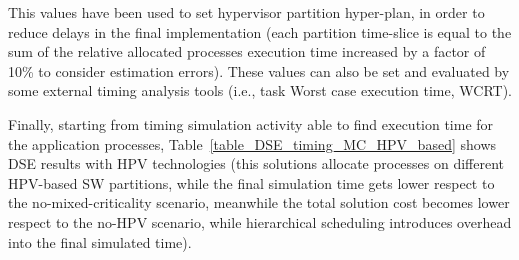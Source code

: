 \normalsize
%
This values have been used to set hypervisor partition hyper-plan, in order to reduce delays in the final implementation (each partition time-slice is equal to the sum of the relative allocated processes execution time increased by a factor of 10\% to consider estimation errors). These values can also be set and evaluated by some external timing analysis tools (i.e., task Worst case execution time, WCRT). \par
Finally, starting from timing simulation activity able to find execution time for the application processes, Table~\ref{table_DSE_timing_MC_HPV_based} shows DSE results with HPV technologies (this solutions allocate processes on different HPV-based SW partitions, while the final simulation time gets lower respect to the no-mixed-criticality scenario, meanwhile the total solution cost becomes lower respect to the no-HPV scenario, while hierarchical scheduling introduces overhead into the final simulated time). \par
%
\begin{table}[htbp]
\caption{Timing Simulation (with hierarchical scheduling).}
\begin{center}
\label{table_DSE_timing_MC_HPV_based}
\end{center}
\end{table}
